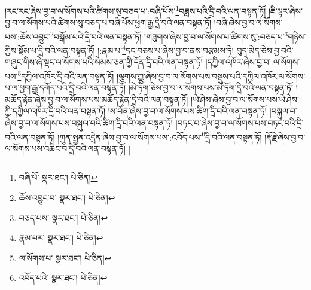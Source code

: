 །རང་རང་ཞེས་བྱ་བ་ལ་སོགས་པའི་ཚིགས་སུ་བཅད་པ་:བཞི་པོས་\footnote{བཞི་པོ་  སྣར་ཐང་།  པེ་ཅིན། }བཟླས་པའི་དྲི་བའི་ལན་བསྟན་ཏོ། །ཇི་ལྟར་ཞེས་བྱ་བ་ལ་སོགས་པའི་ཚིགས་སུ་བཅད་པ་བཞི་པོས་ཕྱག་རྒྱ་དྲི་བའི་ལན་བསྟན་ཏོ། །བཞི་ཞེས་བྱ་བ་ལ་སོགས་པས་:ཆོས་འབྱུང་\footnote{ཆོས་འབྱུང་བ་  སྣར་ཐང་།  པེ་ཅིན། }བསྒོམ་པའི་དྲི་བའི་ལན་བསྟན་ཏོ། །གཟུགས་ཞེས་བྱ་བ་ལ་སོགས་པ་ཚིགས་སུ་:བཅད་པ་\footnote{བཅད་པས་  སྣར་ཐང་།  པེ་ཅིན། }གཉིས་ཀྱིས་སྡོམ་པ་དྲི་བའི་ལན་བསྟན་ཏོ། །:རྣམ་པ་\footnote{རྣམ་པར་  སྣར་ཐང་།  པེ་ཅིན། }དང་བཅས་པ་ཞེས་བྱ་བ་ནས་བརྩམས་ཏེ། བུད་མེད་ཅེས་བྱ་བའི་གཞུང་གིས་ཞེ་སྡང་ལ་སོགས་པའི་སེམས་ཅན་གྱི་དོན་དྲི་བའི་ལན་བསྟན་ཏོ། །དཀྱིལ་འཁོར་ཞེས་བྱ་བ་:ལ་སོགས་པས་\footnote{ལ་སོགས་པ་  སྣར་ཐང་།  པེ་ཅིན། }དཀྱིལ་འཁོར་དྲི་བའི་ལན་བསྟན་ཏོ། །ལྕགས་ཀྱུ་ཞེས་བྱ་བ་ལ་སོགས་པས་བསྡུས་པའི་དཀྱིལ་འཁོར་ལ་སོགས་པ་ལ་ཕྱག་རྒྱ་དགོད་པའི་དྲི་བའི་ལན་བསྟན་ཏོ། །མེ་ཏོག་ཅེས་བྱ་བ་ལ་སོགས་པས་མེ་ཏོག་དྲི་བའི་ལན་བསྟན་ཏོ། །མཆོད་རྟེན་ཞེས་བྱ་བ་ལ་སོགས་པས་མཆོད་རྟེན་དྲི་བའི་ལན་བསྟན་ཏོ། །ཡེ་ཤེས་ཞེས་བྱ་བ་ལ་སོགས་པས་ཡེ་ཤེས་ཀྱི་དཀྱིལ་འཁོར་དྲི་བའི་ལན་བསྟན་ཏོ། །ས་བོན་ཞེས་བྱ་བ་ལ་སོགས་པས་ཚིག་དྲི་བའི་ལན་བསྟན་ཏོ། །བསྐུལ་བ་ཞེས་བྱ་བ་ལ་སོགས་པས་བསྐུལ་བའི་ཚིག་དྲི་བའི་ལན་བསྟན་ཏོ། །བཏང་བ་ཞེས་བྱ་བ་ལ་སོགས་པས་བཏང་བའི་དྲི་བའི་ལན་བསྟན་ཏོ། །ཀུན་སྤྱན་འདྲེན་ཞེས་བྱ་བ་ལ་སོགས་པས་:འབོད་པས་\footnote{འབོད་པའི་  སྣར་ཐང་།  པེ་ཅིན། }དྲི་བའི་ལན་བསྟན་ཏོ། །རྡོ་རྗེ་ཞེས་བྱ་བ་ལ་སོགས་པས་འཆིང་བ་དྲི་བའི་ལན་བསྟན་ཏོ། །
